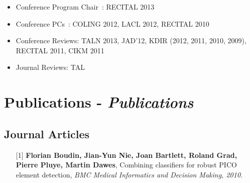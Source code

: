 \documentclass[11pt,a4paper]{moderncv}
\begin{document}
\begin{itemize}[leftmargin=0.5cm,itemsep=-0.1cm]
    \item Conference Program Chair~: RECITAL 2013
    \item Conference PCs~: COLING 2012, LACL 2012, RECITAL 2010
    \item Conference Reviews: TALN 2013, JAD'12, KDIR (2012, 2011, 2010, 2009), RECITAL 2011, CIKM 2011
    \item Journal Reviews: TAL
\end{itemize}

\section{Publications - \textit{Publications}}

\setlength{\hintscolumnwidth}{0cm}

    \subsection{Journal Articles}
    \begin{itemize}[leftmargin=1.2cm,itemsep=0.1cm]
        \item[{\small$[$1$]$}] \textbf{Florian Boudin, Jian-Yun Nie, Joan Bartlett, Roland Grad, Pierre Pluye, Martin Dawes}, Combining classifiers for robust PICO element detection, \textit{BMC Medical Informatics and Decision Making, 2010}.
    \end{itemize}
\end{document}
